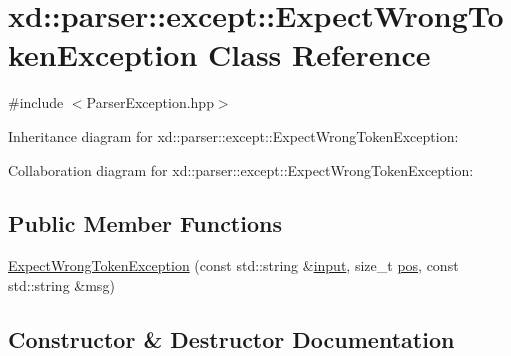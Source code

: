 \hypertarget{classxd_1_1parser_1_1except_1_1_expect_wrong_token_exception}{}\section{xd\+:\+:parser\+:\+:except\+:\+:Expect\+Wrong\+Token\+Exception Class Reference}
\label{classxd_1_1parser_1_1except_1_1_expect_wrong_token_exception}


{\ttfamily \#include $<$Parser\+Exception.\+hpp$>$}



Inheritance diagram for xd\+:\+:parser\+:\+:except\+:\+:Expect\+Wrong\+Token\+Exception\+:


Collaboration diagram for xd\+:\+:parser\+:\+:except\+:\+:Expect\+Wrong\+Token\+Exception\+:
\subsection*{Public Member Functions}
\begin{DoxyCompactItemize}
\item 
\mbox{\hyperlink{classxd_1_1parser_1_1except_1_1_expect_wrong_token_exception_a9a4e26976fb30b5d63c306b98c352ba7}{Expect\+Wrong\+Token\+Exception}} (const std\+::string \&\mbox{\hyperlink{classxd_1_1parser_1_1except_1_1_parser_exception_a6fde0ecef06df6bc2bcaef504269acea}{input}}, size\+\_\+t \mbox{\hyperlink{classxd_1_1parser_1_1except_1_1_parser_exception_ab58b07ce51aef576df0cfe45f0c7e222}{pos}}, const std\+::string \&msg)
\end{DoxyCompactItemize}


\subsection{Constructor \& Destructor Documentation}
\mbox{\label{classxd_1_1parser_1_1except_1_1_expect_wrong_token_exception_a9a4e26976fb30b5d63c306b98c352ba7}} 
